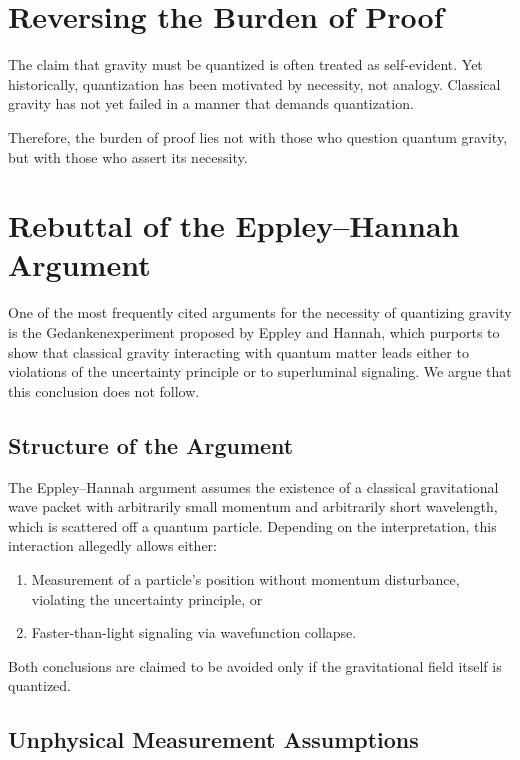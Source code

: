 \documentclass[12pt]{article}
\begin{document}
\section{Reversing the Burden of Proof}

The claim that gravity must be quantized is often treated as self-evident. Yet
historically, quantization has been motivated by necessity, not analogy.
Classical gravity has not yet failed in a manner that demands quantization.

Therefore, the burden of proof lies not with those who question quantum
gravity, but with those who assert its necessity.


\section{Rebuttal of the Eppley--Hannah Argument}

One of the most frequently cited arguments for the necessity of quantizing
gravity is the Gedankenexperiment proposed by Eppley and Hannah, which purports
to show that classical gravity interacting with quantum matter leads either to
violations of the uncertainty principle or to superluminal signaling. We argue
that this conclusion does not follow.

\subsection{Structure of the Argument}

The Eppley--Hannah argument assumes the existence of a classical gravitational
wave packet with arbitrarily small momentum and arbitrarily short wavelength,
which is scattered off a quantum particle. Depending on the interpretation,
this interaction allegedly allows either:
\begin{enumerate}
    \item Measurement of a particle's position without momentum disturbance,
        violating the uncertainty principle, or
    \item Faster-than-light signaling via wavefunction collapse.
\end{enumerate}

Both conclusions are claimed to be avoided only if the gravitational field
itself is quantized.

\subsection{Unphysical Measurement Assumptions}
\end{document}
